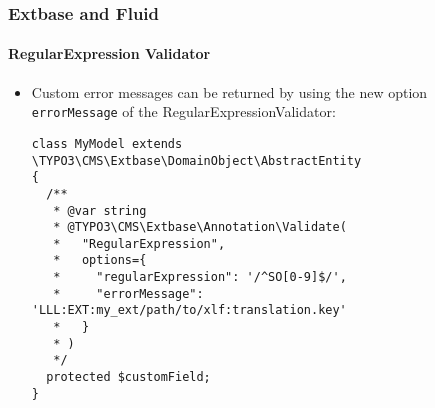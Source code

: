 %

\begin{frame}[fragile]
	\frametitle{Extbase and Fluid}
	\framesubtitle{RegularExpression Validator}

	\lstset{basicstyle=\tiny\ttfamily}

	\begin{itemize}
		\item Custom error messages can be returned by using the new option
			\texttt{errorMessage} of the RegularExpressionValidator:
\begin{lstlisting}
class MyModel extends \TYPO3\CMS\Extbase\DomainObject\AbstractEntity
{
  /**
   * @var string
   * @TYPO3\CMS\Extbase\Annotation\Validate(
   *   "RegularExpression",
   *   options={
   *     "regularExpression": '/^SO[0-9]$/',
   *     "errorMessage": 'LLL:EXT:my_ext/path/to/xlf:translation.key'
   *   }
   * )
   */
  protected $customField;
}
\end{lstlisting}

	\end{itemize}

\end{frame}

